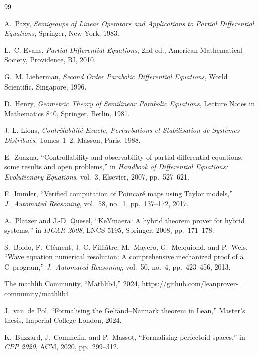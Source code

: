 \documentclass[11pt,a4paper]{article}
\theoremstyle{plain}
\theoremstyle{definition}
\theoremstyle{remark}
\begin{document}
\begin{thebibliography}{99}

A.~Pazy,
\emph{Semigroups of Linear Operators and Applications to Partial
Differential Equations},
Springer, New York, 1983.

L.~C. Evans,
\emph{Partial Differential Equations},
2nd ed., American Mathematical Society, Providence, RI, 2010.

G.~M. Lieberman,
\emph{Second Order Parabolic Differential Equations},
World Scientific, Singapore, 1996.

D.~Henry,
\emph{Geometric Theory of Semilinear Parabolic Equations},
Lecture Notes in Mathematics 840, Springer, Berlin, 1981.

J.-L. Lions,
\emph{Contr\^{o}labilit\'{e} Exacte, Perturbations et Stabilisation de
Syst\`{e}mes Distribu\'{e}s}, Tomes~1--2,
Masson, Paris, 1988.

E.~Zuazua,
``Controllability and observability of partial differential equations:
some results and open problems,''
in \emph{Handbook of Differential Equations: Evolutionary Equations},
vol.~3, Elsevier, 2007, pp.~527--621.

F.~Immler,
``Verified computation of Poincar\'{e} maps using Taylor models,''
\emph{J.\ Automated Reasoning}, vol.~58, no.~1, pp.~137--172, 2017.

A.~Platzer and J.-D. Quesel,
``KeYmaera: A hybrid theorem prover for hybrid systems,''
in \emph{IJCAR 2008}, LNCS 5195, Springer, 2008, pp.~171--178.

S.~Boldo, F.~Cl\'{e}ment, J.-C. Filli\^{a}tre, M.~Mayero,
G.~Melquiond, and P.~Weis,
``Wave equation numerical resolution: A comprehensive mechanized proof
of a C~program,''
\emph{J.\ Automated Reasoning}, vol.~50, no.~4, pp.~423--456, 2013.

The mathlib Community,
``Mathlib4,'' 2024,
\url{https://github.com/leanprover-community/mathlib4}.

J.~van~de Pol,
``Formalising the Gelfand--Naimark theorem in Lean,''
Master's thesis, Imperial College London, 2024.

K.~Buzzard, J.~Commelin, and P.~Massot,
``Formalising perfectoid spaces,''
in \emph{CPP 2020}, ACM, 2020, pp.~299--312.


\end{thebibliography}
\end{document}
